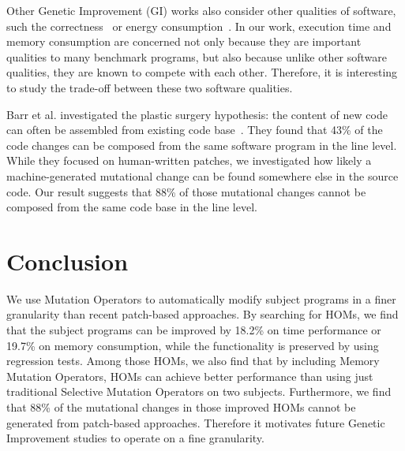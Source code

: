 \documentclass[oribibl]{llncs}
\begin{document}
Other Genetic Improvement (GI) works also consider other qualities of software, such the correctness~\cite{6035728} or energy consumption~\cite{Bruce:2015:REC:2739480.2754752}.
In our work, execution time and memory consumption are concerned not only because they are important qualities to many benchmark programs, but also because unlike other software qualities, they are known to compete with each other.
Therefore, it is interesting to study the trade-off between these two software qualities.

Barr et al. investigated the plastic surgery hypothesis: the content of new code can often be assembled from existing code base~\cite{Barr:2014:PSH:2635868.2635898}.
They found that 43\% of the code changes can be composed from the same software program in the line level.
While they focused on human-written patches, we investigated how likely a machine-generated mutational change can be found somewhere else in the source code.
Our result suggests that 88\% of those mutational changes cannot be composed from the same code base in the line level.

\section{Conclusion}
\label{sec_conclusion}

We use Mutation Operators to automatically modify subject programs in a finer granularity than recent patch-based approaches.
By searching for HOMs, we find that the subject programs can be improved by 18.2\% on time performance or 19.7\% on memory consumption, while the functionality is preserved by using regression tests.
Among those HOMs, we also find that by including Memory Mutation Operators, HOMs can achieve better performance than using just traditional Selective Mutation Operators on two subjects.
Furthermore, we find that 88\% of the mutational changes in those improved HOMs cannot be generated from patch-based approaches.
Therefore it motivates future Genetic Improvement studies to operate on a fine granularity. 


   
\end{document}
